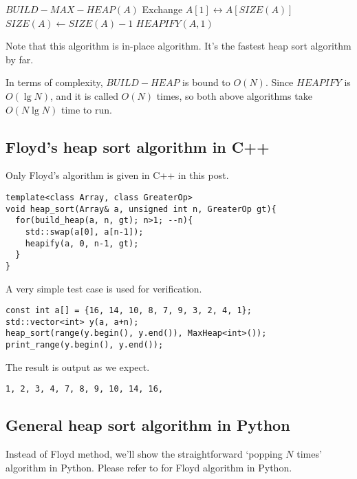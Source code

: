 \documentclass{article}
\begin{document}
\begin{algorithmic}[1]
  \State $BUILD-MAX-HEAP(A)$
    \State Exchange $A[1] \leftrightarrow A[SIZE(A)]$
    \State $SIZE(A) \gets SIZE(A) - 1$
    \State $HEAPIFY(A, 1)$
  \EndWhile
\EndFunction
\end{algorithmic}

Note that this algorithm is in-place algorithm. It's the
fastest heap sort algorithm by far.

In terms of complexity, $BUILD-HEAP$ is bound to $O(N)$. 
Since $HEAPIFY$ is $O(\lg{N})$, and it
is called $O(N)$ times, so both above algorithms take $O(N \lg{N})$
time to run.

\subsection*{Floyd's heap sort algorithm in C++}

Only Floyd's algorithm is given in C++ in this post. 

\lstset{language=C++}
\begin{lstlisting}
template<class Array, class GreaterOp>
void heap_sort(Array& a, unsigned int n, GreaterOp gt){
  for(build_heap(a, n, gt); n>1; --n){
    std::swap(a[0], a[n-1]);
    heapify(a, 0, n-1, gt);
  }
}
\end{lstlisting}

A very simple test case is used for verification.

\begin{lstlisting}
const int a[] = {16, 14, 10, 8, 7, 9, 3, 2, 4, 1};
std::vector<int> y(a, a+n);
heap_sort(range(y.begin(), y.end()), MaxHeap<int>());
print_range(y.begin(), y.end());
\end{lstlisting}

The result is output as we expect.

\begin{verbatim}
1, 2, 3, 4, 7, 8, 9, 10, 14, 16,
\end{verbatim}

\subsection*{General heap sort algorithm in Python}

Instead of Floyd method, we'll show the straightforward
`popping $N$ times' algorithm in Python. Please refer
to \cite{rosetta-heapsort} for Floyd algorithm in Python.
\end{document}
